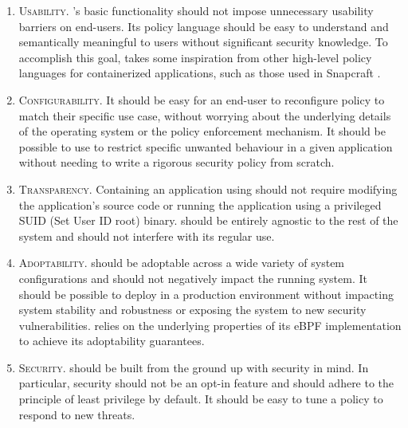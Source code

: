 \begin{enumerate}[label=\bfseries D\arabic*., ref=D\arabic*, labelindent=1em]
  \item \label{d:1} \textsc{Usability.}
    \bpfcontain{}'s basic functionality should not impose unnecessary usability
    barriers on end-users.  Its policy language should be easy to understand and
    semantically meaningful to users without significant security knowledge. To
    accomplish this goal, \bpfcontain{} takes some inspiration from other high-level
    policy languages for containerized applications, such as those used in
    Snapcraft \cite{snap}.

  \item \label{d:2} \textsc{Configurability.}
    It should be easy for an end-user to reconfigure policy to match their
    specific use case, without worrying about the underlying details of the
    operating system or the policy enforcement mechanism. It should be possible
    to use \bpfcontain{} to restrict specific unwanted behaviour in a given
    application without needing to write a rigorous security policy from
    scratch.

  \item \label{d:3} \textsc{Transparency.}
    Containing an application using \bpfcontain{} should not require modifying the
    application's source code or running the application using a privileged SUID
    (Set User ID root) binary. \bpfcontain{} should be entirely agnostic to the rest
    of the system and should not interfere with its regular use.

  \item \label{d:4} \textsc{Adoptability.}
    \bpfcontain{} should be adoptable across a wide variety of system configurations
    and should not negatively impact the running system. It should be possible
    to deploy \bpfcontain{} in a production environment without impacting system
    stability and robustness or exposing the system to new security
    vulnerabilities. \bpfcontain{} relies on the underlying properties of its eBPF
    implementation to achieve its adoptability guarantees.

  \item \label{d:5} \textsc{Security.}
    \bpfcontain{} should be built from the ground up with security in mind. In
    particular, security should not be an opt-in feature and \bpfcontain{} should
    adhere to the principle of least privilege \cite{saltzer1975_protection} by
    default. It should be easy to tune a \bpfcontain{} policy to respond to new
    threats.
\end{enumerate}

